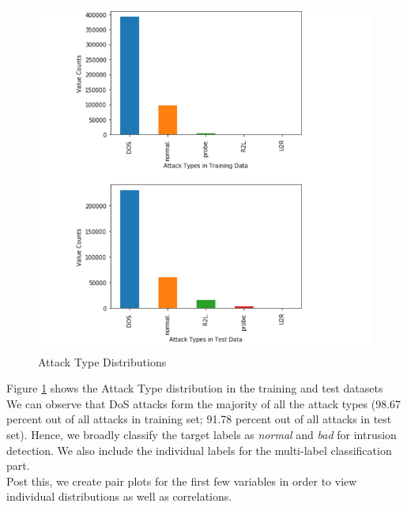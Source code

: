 \begin{figure}
	\includegraphics[width=1.0\columnwidth]{images/attack_type.PNG}
	\caption{Attack Type Distributions}
	\label{F:att}
\end{figure}
Figure \ref{F:att} shows the Attack Type distribution in the training and test datasets\\
We can observe that DoS attacks form the majority of all the attack types (98.67 percent out of all attacks in training set; 91.78 percent out of all attacks in test set). Hence, we broadly classify the target labels as {\em normal} and {\em bad} for intrusion detection. We also include the individual labels for the multi-label classification part.\\
Post this, we create pair plots for the first few variables in order to view individual distributions as well as correlations.
